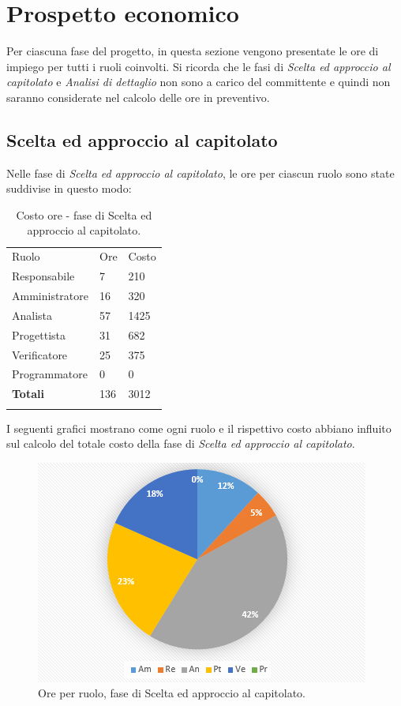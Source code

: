 \documentclass[a4paper]{article}
\begin{document}
	\newpage 
	\section{Prospetto economico}
	
		Per ciascuna fase del progetto, in questa sezione vengono presentate le ore di impiego per tutti i 
		ruoli coinvolti. Si ricorda che le fasi di \emph{Scelta ed approccio al capitolato} e \emph{Analisi di dettaglio} non sono 
		a carico del committente e quindi non saranno considerate nel calcolo delle ore in preventivo.
		
		\subsection{Scelta ed approccio al capitolato}
			Nelle fase di \emph{Scelta ed approccio al capitolato}, le ore per ciascun ruolo sono state suddivise in questo modo:
			\begin{table}[H]
				\begin{tabularx}{\textwidth}{Y Y Y}
					Ruolo & Ore & Costo \\
					Responsabile & 7 & 210 \\
					Amministratore & 16 & 320 \\
					Analista & 57 & 1425\\
					Progettista & 31 & 682\\
					Verificatore & 25 & 375\\
					Programmatore & 0 & 0 \\
					\textbf{Totali} & 136 & 3012 \\
				\end{tabularx}
				\caption{Costo ore - fase di Scelta ed approccio al capitolato. } 
				\label{TCAnalisi}
			\end{table}
			I seguenti grafici mostrano come ogni ruolo e il rispettivo costo abbiano influito sul calcolo del totale 
			costo della fase di \emph{Scelta ed approccio al capitolato}.
			\begin{figure}[H]
				\centering
				\includegraphics[scale=0.7]{pc_approccio}
				\caption{Ore per ruolo, fase di Scelta ed approccio al capitolato.}
			\end{figure}
\end{document}
